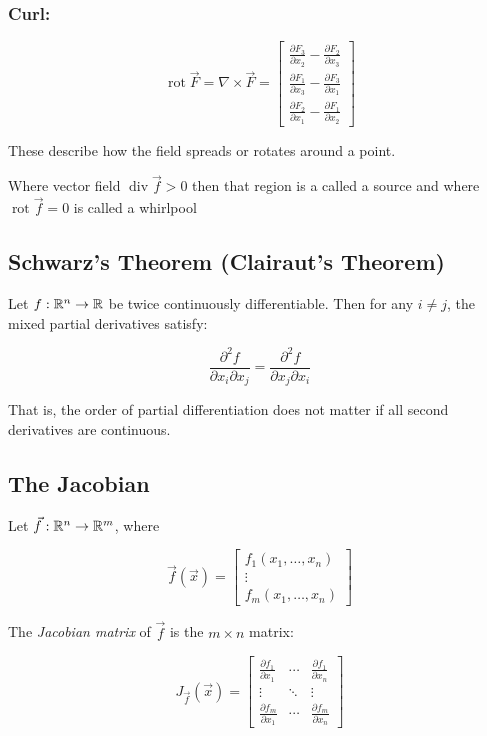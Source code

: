 \subsubsection{Curl:}

\[
    \operatorname{rot} \vec{F} = \nabla \times \vec{F} = \begin{bmatrix}
    \frac{\partial F_3}{\partial x_2} - \frac{\partial F_2}{\partial x_3} \\
    \frac{\partial F_1}{\partial x_3} - \frac{\partial F_3}{\partial x_1} \\
    \frac{\partial F_2}{\partial x_1} - \frac{\partial F_1}{\partial x_2}
    \end{bmatrix}
\]

These describe how the field spreads or rotates around a point.

Where vector field \( \operatorname{div}\vec{f} > 0\) then that region is a called a source
and where \(\operatorname{rot}\vec{f} = 0\) is called a whirlpool

\subsection{Schwarz’s Theorem (Clairaut’s Theorem)}

Let \( f : \mathbb{R}^n \to \mathbb{R} \) be twice continuously differentiable. Then for any \( i \ne j \), 
the mixed partial derivatives satisfy:

\[
    \frac{\partial^2 f}{\partial x_i \partial x_j} = \frac{\partial^2 f}{\partial x_j \partial x_i}
\]

That is, the order of partial differentiation does not matter if all second derivatives are continuous.

\subsection{The Jacobian}

Let \( \vec{f} : \mathbb{R}^n \to \mathbb{R}^m \), where

\[
    \vec{f}(\vec{x}) = \begin{bmatrix}
    f_1(x_1, \dots, x_n) \\
    \vdots \\
    f_m(x_1, \dots, x_n)
    \end{bmatrix}
\]

The \emph{Jacobian matrix} of \( \vec{f} \) is the \( m \times n \) matrix:

\[
    J_{\vec{f}}(\vec{x}) = \begin{bmatrix}
    \frac{\partial f_1}{\partial x_1} & \cdots & \frac{\partial f_1}{\partial x_n} \\
    \vdots & \ddots & \vdots \\
    \frac{\partial f_m}{\partial x_1} & \cdots & \frac{\partial f_m}{\partial x_n}
    \end{bmatrix}
\]

